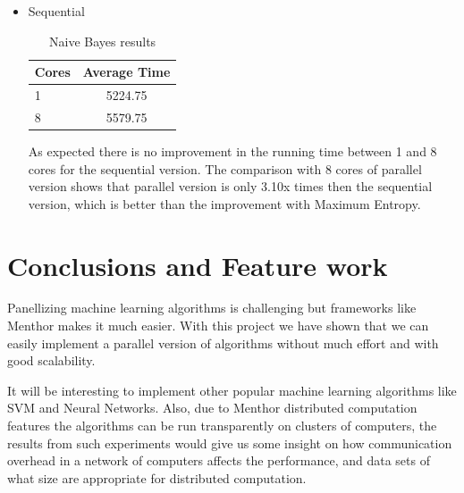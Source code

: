 \documentclass{report}
\begin{document}
\begin{itemize}
\item Sequential

\begin{table}[!htb]
\centering
\begin{tabular}{ l c }
    \hline\hline
    Cores & Average Time \\ [0.2ex]
    \hline
    1 & 5224.75 \\
    8 & 5579.75  \\
    \hline
  \end{tabular}
\label{table:naivebayes2}
\caption{Naive Bayes results}
\end{table}

As expected there is no improvement in the running time between 1 and 8 cores for the sequential version.  The comparison with 8 cores of parallel version shows that parallel version is only 3.10x times then the sequential version, which is better than the improvement with Maximum Entropy.

\end{itemize}

\chapter{Conclusions and Feature work}

Panellizing machine learning algorithms is challenging but frameworks like Menthor makes it much easier. With this project we have shown that  we can easily implement a parallel version of algorithms without much effort and with good scalability.

It will be interesting to implement other popular machine learning algorithms like SVM and Neural Networks. Also, due to Menthor distributed computation features the algorithms can be run transparently on clusters of computers, the results from  such experiments would give us some insight on how communication overhead in a network of computers affects the performance, and data sets of what size are appropriate for distributed computation.

{}

\end{document}
